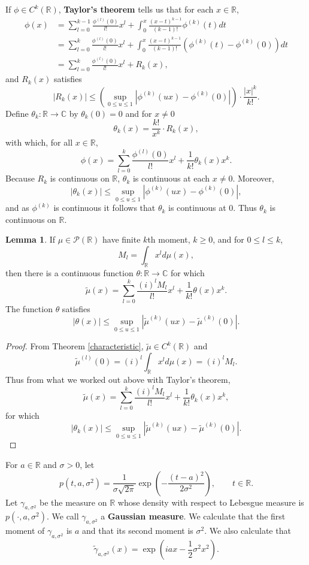 \documentclass{article}
\theoremstyle{definition}
\newtheorem{lemma}[theorem]{Lemma}
\theoremstyle{definition}
\begin{document}
If $\phi \in C^k(\mathbb{R})$, \textbf{Taylor's theorem} tells us that for each
$x \in \mathbb{R}$,
\begin{align*}
\phi(x) &= \sum_{l=0}^{k-1} \frac{\phi^{(l)}(0)}{l!} x^l
+\int_0^x \frac{(x-t)^{k-1}}{(k-1)!} \phi^{(k)}(t)dt\\
&=\sum_{l=0}^k \frac{\phi^{(l)}(0)}{l!} x^l+\int_0^x \frac{(x-t)^{k-1}}{(k-1)!}(\phi^{(k)}(t)-\phi^{(k)}(0)) dt\\
&=\sum_{l=0}^k \frac{\phi^{(l)}(0)}{l!} x^l 
+R_k(x),
\end{align*}
and $R_k(x)$ satisfies
\[
|R_k(x)| \leq \left(\sup_{0 \leq u \leq 1} |\phi^{(k)}(ux)-\phi^{(k)}(0)|\right) \cdot \frac{|x|^k}{k!}.
\]
Define $\theta_k:\mathbb{R} \to \mathbb{C}$ by $\theta_k(0)=0$ and
for $x \neq 0$
\[
\theta_k(x) = \frac{k!}{x^k} \cdot R_k(x),
\]
with which, for all $x \in \mathbb{R}$,
\[
\phi(x) = \sum_{l=0}^k \frac{\phi^{(l)}(0)}{l!} x^l + \frac{1}{k!} \theta_k(x) x^k.
\]
Because $R_k$ is continuous on $\mathbb{R}$, $\theta_k$ is continuous at each $x \neq 0$.
Moreover,
\[
|\theta_k(x)| \leq \sup_{0 \leq u \leq 1} |\phi^{(k)}(ux)-\phi^{(k)}(0)|,
\]
and as $\phi^{(k)}$ is continuous it follows that
 $\theta_k$ is continuous at $0$. Thus $\theta_k$ is continuous on $\mathbb{R}$. 

\begin{lemma}
If $\mu \in \mathscr{P}(\mathbb{R})$ have finite $k$th moment, $k \geq 0$, and for $0 \leq l \leq k$,
\[
M_l = \int_\mathbb{R} x^l d\mu(x),
\]
then there is a continuous function $\theta:\mathbb{R} \to \mathbb{C}$ for which
\[
\tilde{\mu}(x) = \sum_{l=0}^k \frac{(i)^l M_l}{l!} x^l + \frac{1}{k!} \theta(x) x^k.
\]
The function $\theta$ satisfies
\[
|\theta(x)| \leq  \sup_{0 \leq u \leq 1} |\tilde{\mu}^{(k)}(ux)-\tilde{\mu}^{(k)}(0)|.
\]
\label{moments}
\end{lemma}
\begin{proof}
From  Theorem \ref{characteristic}, $\tilde{\mu} \in C^k(\mathbb{R})$ and
\[
\tilde{\mu}^{(l)}(0) = (i)^l \int_\mathbb{R} x^l d\mu(x) = (i)^l M_l.
\]
Thus from what we worked out above with Taylor's theorem,
\[
\tilde{\mu}(x) = \sum_{l=0}^k \frac{(i)^l M_l}{l!} x^l + \frac{1}{k!} \theta_k(x) x^k,
\]
for which
\[
|\theta_k(x)| \leq  \sup_{0 \leq u \leq 1} |\tilde{\mu}^{(k)}(ux)-\tilde{\mu}^{(k)}(0)|.
\]
\end{proof}



For $a \in \mathbb{R}$ and $\sigma>0$, 
let 
\[
p(t,a,\sigma^2) = \frac{1}{\sigma \sqrt{2\pi}} \exp\left( - \frac{(t-a)^2}{2\sigma^2} \right), \qquad  t \in\mathbb{R}.
\]
Let $\gamma_{a,\sigma^2}$ be the measure on $\mathbb{R}$ whose density with respect
to Lebesgue measure is $p(\cdot,a,\sigma^2)$. We call $\gamma_{a,\sigma^2}$ a \textbf{Gaussian measure}.
We calculate that the first moment of  $\gamma_{a,\sigma^2}$ is $a$ and that its second moment
is
$\sigma^2$. We also
calculate that
\[
\tilde{\gamma}_{a,\sigma^2}(x) = \exp\left(iax - \frac{1}{2}\sigma^2 x^2\right).
\]
\end{document}

